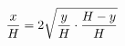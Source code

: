 \documentclass[preview]{standalone}
\begin{document}
\begin{align*}
\special{dvisvgm:raw <g id='unique000'>}\frac{x}{H} = 2 \sqrt{\frac{y}{H} \cdot \frac{H - y}{H}}\special{dvisvgm:raw </g>}
\end{align*}
\end{document}
